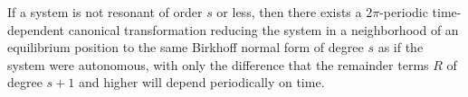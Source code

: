 If a system is not resonant of order $s$ or less, then there exists a $2\pi$-periodic time-dependent canonical transformation reducing the system in a neighborhood of an equilibrium position to the same Birkhoff normal form of degree $s$ as if the system were autonomous, with only the difference that the remainder terms $R$ of degree $s+1$ and higher will depend periodically on time.
